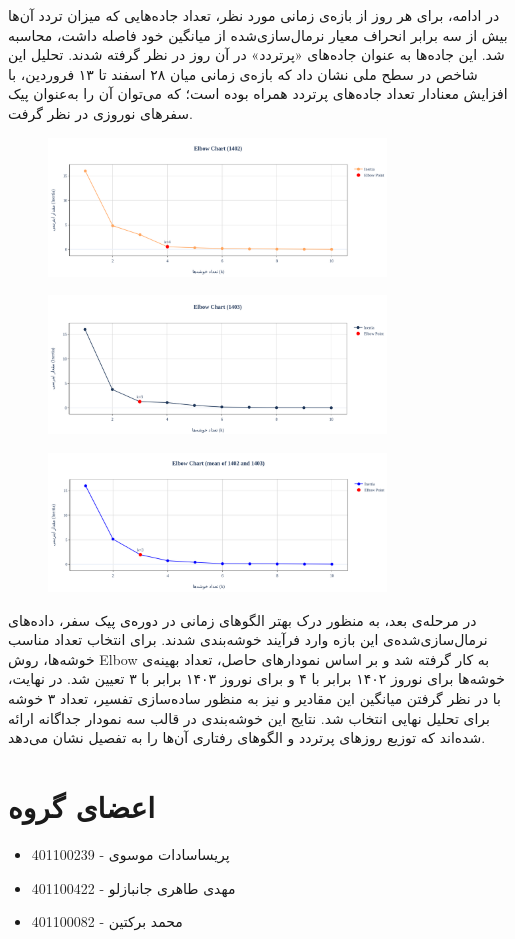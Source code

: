 \documentclass[a4paper, 12pt]{article}
\begin{document}
\medskip
در ادامه، برای هر روز از بازه‌ی زمانی مورد نظر، تعداد جاده‌هایی که میزان تردد آن‌ها بیش از سه برابر انحراف معیار نرمال‌سازی‌شده از میانگین خود فاصله داشت، محاسبه شد. این جاده‌ها به عنوان جاده‌های «پرتردد» در آن روز در نظر گرفته شدند. تحلیل این شاخص در سطح ملی نشان داد که بازه‌ی زمانی میان ۲۸ اسفند تا ۱۳ فروردین، با افزایش معنادار تعداد جاده‌های پرتردد همراه بوده است؛ که می‌توان آن را به‌عنوان پیک سفرهای نوروزی در نظر گرفت.

\begin{figure}[H]
    \centering
    \includegraphics[width=0.8\textwidth]{peaks-pics/elbow1402.png}
\end{figure}

\begin{figure}[H]
    \centering
    \includegraphics[width=0.8\textwidth]{peaks-pics/elbow1403.png}
\end{figure}

\begin{figure}[H]
    \centering
    \includegraphics[width=0.8\textwidth]{peaks-pics/elbowmean.png}
\end{figure}

در مرحله‌ی بعد، به منظور درک بهتر الگوهای زمانی در دوره‌ی پیک سفر، داده‌های نرمال‌سازی‌شده‌ی این بازه وارد فرآیند خوشه‌بندی شدند. برای انتخاب تعداد مناسب خوشه‌ها، روش Elbow به کار گرفته شد و بر اساس نمودارهای حاصل، تعداد بهینه‌ی خوشه‌ها برای نوروز ۱۴۰۲ برابر با ۴ و برای نوروز ۱۴۰۳ برابر با ۳ تعیین شد. در نهایت، با در نظر گرفتن میانگین این مقادیر و نیز به منظور ساده‌سازی تفسیر، تعداد ۳ خوشه برای تحلیل نهایی انتخاب شد. نتایج این خوشه‌بندی در قالب سه نمودار جداگانه ارائه شده‌اند که توزیع روزهای پرتردد و الگوهای رفتاری آن‌ها را به تفصیل نشان می‌دهد.


\section{اعضای گروه}
\begin{itemize}
    \item پریساسادات موسوی - 401100239
    \item مهدی طاهری جانبازلو - 401100422
    \item محمد برکتین - 401100082
\end{itemize}
\end{document}
